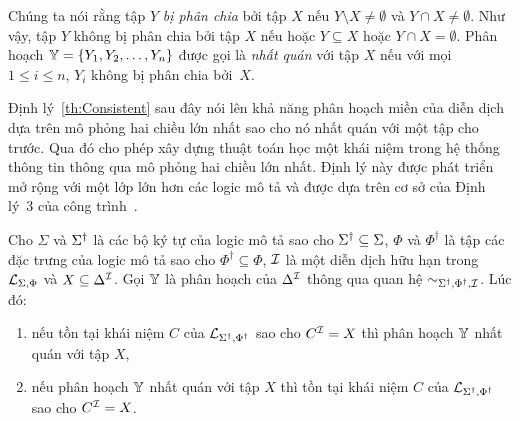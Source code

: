 Chúng ta nói rằng tập $Y$ {\em bị phân chia} bởi tập $X$ nếu $Y \setminus X \neq \emptyset$ và $Y \cap X \neq \emptyset$. Như vậy, tập $Y$ không bị phân chia bởi tập $X$ nếu hoặc $Y \subseteq X$ hoặc $Y \cap X = \emptyset$.
Phân hoạch $\mathbb{Y} = \{Y_1, Y_2, \ldots,Y_n\}$ được gọi là {\em nhất quán} với tập $X$ nếu với mọi $1 \leq i \leq n$, $Y_i$ không bị phân chia bởi~$X$.

Định lý~\ref{th:Consistent} sau đây nói lên khả năng phân hoạch miền của diễn dịch dựa trên mô phỏng hai chiều lớn nhất sao cho nó nhất quán với một tập cho trước. Qua đó cho phép xây dựng thuật toán học một khái niệm trong hệ thống thông tin thông qua mô phỏng hai chiều lớn nhất. Định lý này được phát triển mở rộng với một lớp lớn hơn các logic mô tả và được dựa trên cơ sở của Định lý~3 của công trình~\cite{Nguyen2013}.

\begin{Theorem}
\label{th:Consistent}
Cho $\Sigma$ và $\Sigma^\dag$ là các bộ ký tự của logic mô tả sao cho $\Sigma^\dag \subseteq \Sigma$, $\Phi$ và $\Phi^\dag$ là tập các đặc trưng của logic mô tả sao cho $\Phi^\dag \subseteq \Phi$, $\mathcal{I}$ là một diễn dịch hữu hạn trong $\mathcal{L}_{\Sigma,\Phi}$ và $X \subseteq \Delta^{\mathcal{I}}$. Gọi $\mathbb{Y}$ là phân hoạch của $\Delta^{\mathcal{I}}$ thông qua quan hệ $\sim_{\Sigma^\dag,\Phi^\dag,\mathcal{I}}$. Lúc đó:
\begin{enumerate}
  \item nếu tồn tại khái niệm $C$ của $\mathcal{L}_{\Sigma^\dag,\Phi^\dag}$ sao cho $C^{\mathcal{I}} = X$ thì phân hoạch $\mathbb{Y}$ nhất quán với tập $X$,  
  \item nếu phân hoạch $\mathbb{Y}$ nhất quán với tập $X$ thì tồn tại khái niệm $C$ của $\mathcal{L}_{\Sigma^\dag,\Phi^\dag}$ sao cho $C^{\mathcal{I}} = X$.\myend
\end{enumerate}
\end{Theorem}

